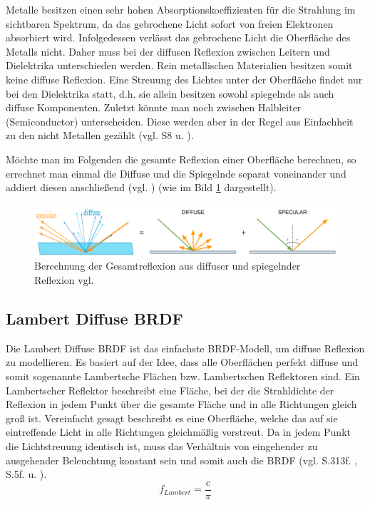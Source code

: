 \documentclass[
  11pt,
  a4paper,
  oneside
  ]{article}
\begin{document}
Metalle besitzen einen sehr hohen Absorptionskoeffizienten für die Strahlung im sichtbaren Spektrum, da das gebrochene Licht sofort von freien Elektronen absorbiert wird. Infolgedessen verlässt das gebrochene Licht die Oberfläche des Metalls nicht. Daher muss bei der diffusen Reflexion zwischen Leitern und Dielektrika unterschieden werden. Rein metallischen Materialien besitzen somit keine diffuse Reflexion. Eine Streuung des Lichtes unter der Oberfläche findet nur bei den Dielektrika statt, d.h. sie allein besitzen sowohl spiegelnde als auch diffuse Komponenten. Zuletzt könnte man noch zwischen Halbleiter (Semiconductor) unterscheiden. Diese werden aber in der Regel aus Einfachheit zu den nicht Metallen gezählt 
(vgl. S8 \cite{rtrPaper} u. \cite{pbrGuide,learnOpenGL,googleFilamentPbr}).

Möchte man im Folgenden die gesamte Reflexion einer Oberfläche berechnen, so errechnet man einmal die Diffuse und die Spiegelnde separat voneinander und addiert diesen anschließend (vgl. \cite{learnOpenGL}) (wie im Bild \ref{fig:img1} dargestellt).
\begin{figure}[H]
  \centering
  \includegraphics*[width=1 \textwidth]{images/brdf.PNG}
  \caption{Berechnung der Gesamtreflexion aus diffuser und spiegelnder Reflexion vgl. \cite{learnOpenGL}}
  \label{fig:img1}
\end{figure}

\subsection{Lambert Diffuse BRDF}
Die Lambert Diffuse BRDF ist das einfachste BRDF-Modell, um diffuse Reflexion zu modellieren. Es basiert auf der Idee, dass alle Oberflächen perfekt diffuse und somit sogenannte Lambertsche Flächen bzw. Lambertschen Reflektoren sind. Ein Lambertscher Reflektor beschreibt eine Fläche, bei der die Strahldichte der Reflexion in jedem Punkt über die gesamte Fläche und in alle Richtungen gleich groß ist. Vereinfacht gesagt beschreibt es eine Oberfläche, welche das auf sie eintreffende Licht in alle Richtungen gleichmäßig verstreut. Da in jedem Punkt die Lichtstreuung identisch ist, muss das Verhältnis von eingehender zu ausgehender Beleuchtung konstant sein und somit auch die BRDF 
(vgl. S.313f. \cite{realTimeRendering4th}, S.5f. \cite{irrlichtOrg} u. \cite{learnOpenGL}). 
\[f_{Lambert}=\dfrac{c}{\pi}\]
\end{document}
